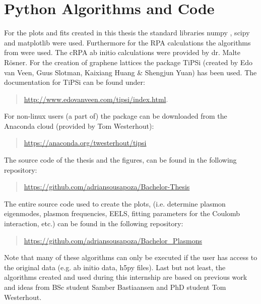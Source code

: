
\setcounter{figure}{0}
\section{Python Algorithms and Code}

For the plots and fits created in this thesis the standard libraries numpy \cite{numpy}, scipy \cite{scipy} and matplotlib \cite{matplotlib} were used. Furthermore for the RPA calculations the algorithms from \textcite{Westerhout2018} were used. The cRPA ab initio calculations were provided by dr. Malte Rösner. For the creation of graphene lattices the package TiPSi (created by Edo van Veen, Guus Slotman, Kaixiang Huang \& Shengjun Yuan) has been used. The documentation for TiPSi can be found under:
\begin{quote}
    \url{http://www.edovanveen.com/tipsi/index.html}.
\end{quote}
For non-linux users (a part of) the package can be downloaded from the Anaconda cloud (provided by Tom Westerhout):
\begin{quote}
    \url{https://anaconda.org/twesterhout/tipsi}
\end{quote}
The source code of the thesis and the figures, can be found in the following repository:
\begin{quote}
    \url{https://github.com/adriansousapoza/Bachelor-Thesis}
\end{quote}
The entire source code used to create the plots, (i.e. determine plasmon eigenmodes, plasmon frequencies, EELS, fitting parameters for the Coulomb interaction, etc.) can be found in the following repository:
\begin{quote}
    \url{https://github.com/adriansousapoza/Bachelor_Plasmons}
\end{quote}
Note that many of these algorithms can only be executed if the user has access to the original data (e.g. ab initio data, h5py files). Last but not least, the algorithms created and used during this internship are based on previous work and ideas from BSc student Samber Bastiaansen and PhD student Tom Westerhout.





